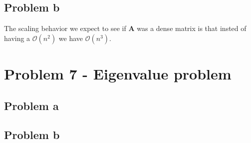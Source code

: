 \documentclass[english,notitlepage]{revtex4-1}  %
\begin{document}
\subsection*{Problem b}
The scaling behavior we expect to see if $\mathbf{A}$ was a dense matrix is that insted of having a $\mathcal{O}(n^2)$ we have $\mathcal{O}(n^3)$.

\section*{Problem 7 - Eigenvalue problem}

\subsection*{Problem a}

\subsection*{Problem b}
\end{document}
